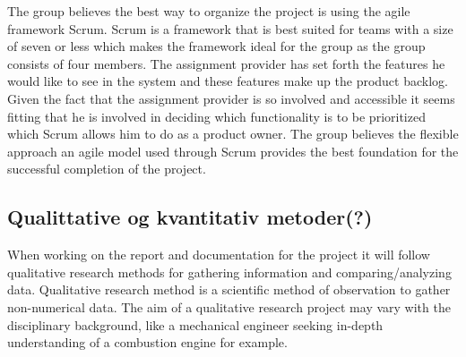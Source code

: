 The group believes the best way to organize the project is using the agile framework Scrum.
Scrum is a framework that is best suited for teams with a size of seven or less \cite{software-engineering-scrum-size} which makes the framework ideal for the group as the group consists of four members.
The assignment provider has set forth the features he would like to see in the system and these features make up the product backlog.
Given the fact that the assignment provider is so involved and accessible it seems fitting that he is involved in deciding which functionality is to be prioritized which Scrum allows him to do as a product owner.
The group believes the flexible approach an agile model used through Scrum provides the best foundation for the successful completion of the project.

\subsection{Qualittative og kvantitativ metoder(?)}
 When working on the report and documentation for the project it will follow qualitative research methods for gathering information and comparing/analyzing data. Qualitative research method is a scientific method of observation to gather non-numerical data. The aim of a qualitative research project may vary with the disciplinary background, like a mechanical engineer seeking in-depth understanding of a combustion engine for example\cite{Qualitative-Research}.
 
